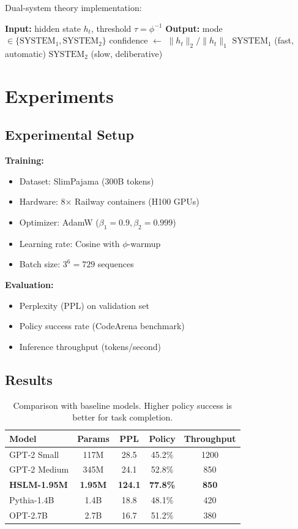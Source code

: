 \documentclass{article}
\newcommand{\phiinv}{\phi^{-1}}
\begin{document}
Dual-system theory implementation:
\begin{algorithm}[H]
\caption{Consciousness Gate}
\begin{algorithmic}[1]
\STATE \textbf{Input:} hidden state $h_t$, threshold $\tau = \phiinv$
\STATE \textbf{Output:} mode $\in \{\text{SYSTEM}_1, \text{SYSTEM}_2\}$
\STATE
\STATE confidence $ \leftarrow$ $\|h_t\|_2 / \|h_t\|_1$
    \RETURN $\text{SYSTEM}_1$ (fast, automatic)
\ELSE
    \RETURN $\text{SYSTEM}_2$ (slow, deliberative)
\ENDIF
\end{algorithmic}
\end{algorithm}

\section{Experiments}

\subsection{Experimental Setup}

\textbf{Training:}
\begin{itemize}
    \item Dataset: SlimPajama (300B tokens)
    \item Hardware: 8$\times$ Railway containers (H100 GPUs)
    \item Optimizer: AdamW ($\beta_1=0.9, \beta_2=0.999$)
    \item Learning rate: Cosine with $\phi$-warmup
    \item Batch size: $3^6 = 729$ sequences
\end{itemize}

\textbf{Evaluation:}
\begin{itemize}
    \item Perplexity (PPL) on validation set
    \item Policy success rate (CodeArena benchmark)
    \item Inference throughput (tokens/second)
\end{itemize}

\subsection{Results}

\begin{table}[h]
\centering
\begin{tabular}{lcccc}
\toprule
Model & Params & PPL & Policy & Throughput \\
\midrule
GPT-2 Small & 117M & 28.5 & 45.2\% & 1200 \\
GPT-2 Medium & 345M & 24.1 & 52.8\% & 850 \\
\textbf{HSLM-1.95M} & \textbf{1.95M} & \textbf{124.1} & \textbf{77.8\%} & \textbf{850} \\
Pythia-1.4B & 1.4B & 18.8 & 48.1\% & 420 \\
OPT-2.7B & 2.7B & 16.7 & 51.2\% & 380 \\
\bottomrule
\end{tabular}
\caption{Comparison with baseline models. Higher policy success is better for task completion.}
\end{table}
\end{document}
